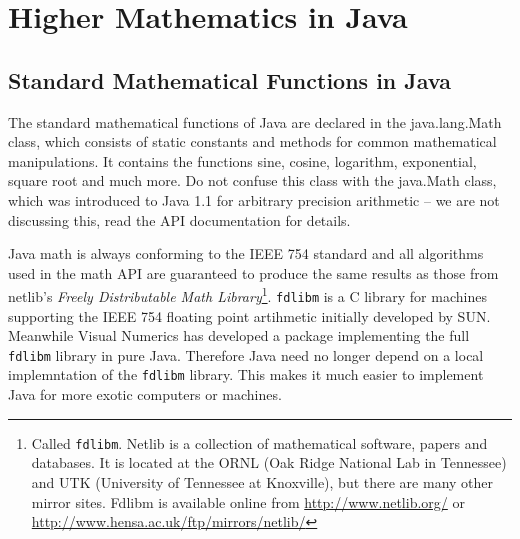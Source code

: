 \section{Higher Mathematics in Java}

\subsection{Standard Mathematical Functions in Java}
\label{sec:Standard_Math}

The standard mathematical functions of Java are declared in the 
java.lang.Math class, which consists of static constants and methods
for common mathematical manipulations. 
It contains the functions sine, cosine, logarithm, exponential,
square root and much more. Do not confuse this class with the
java.Math class, which was introduced to Java 1.1 for arbitrary
precision arithmetic -- we are not discussing this, read the
API documentation for details.

Java math is always conforming to the IEEE 754 standard and all
algorithms used in the math API are guaranteed to produce the
same results as those from netlib's 
\emph{Freely Distributable Math Library}\footnote{Called \texttt{fdlibm}.
Netlib is a collection of mathematical software, papers and databases.
It is located at the ORNL (Oak Ridge National Lab in Tennessee) and UTK (University
of Tennessee at Knoxville), but there are many other mirror sites.
Fdlibm is available online from 
\href{http://www.netlib.org/}{http://www.netlib.org/} or
\href{http://www.hensa.ac.uk/ftp/mirrors/netlib/}%
           {http://www.hensa.ac.uk/ftp/mirrors/netlib/}}.
\verb|fdlibm| is a C library for machines supporting the IEEE 754 floating
point artihmetic initially developed by SUN. Meanwhile Visual Numerics has developed
a package implementing the full \verb|fdlibm| library in pure Java. Therefore
Java need no longer depend on a local implemntation of the 
\verb|fdlibm| library. This makes it much easier to implement Java for 
more exotic computers or machines. 

